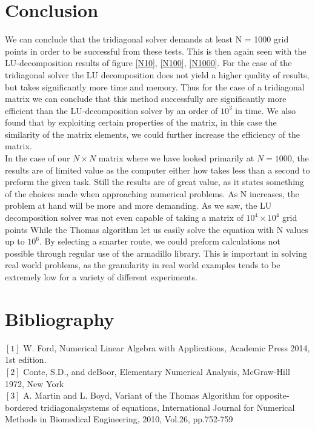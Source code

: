 \documentclass[%
reprint,
amsmath,amssymb,
aps,
]{revtex4-1}
\begin{document}
\section*{Conclusion}
\noindent We can conclude that the tridiagonal solver demands at least N = 1000 grid points in order to be successful from these tests. This is then again seen with the LU-decomposition results of figure \ref{N10}, \ref{N100}, \ref{N1000}. For the case of the tridiagonal solver the LU decomposition does not yield a higher quality of results, but takes significantly more time and memory. Thus for the case of a tridiagonal matrix we can conclude that this method successfully are significantly more efficient than the LU-decomposition solver by an order of $10^3$ in time. We also found that by exploiting certain properties of the matrix, in this case the similarity of the matrix elements, we could further increase the efficiency of the matrix. \\
\indent In the case of our $N\times N$ matrix where we have looked primarily at $N=1000$, the results are of limited value as the computer either how takes less than a second to preform the given task. Still the results are of great value, as it states something of the choices made when approaching numerical problems. As N increases, the problem at hand will be more and more demanding. As we saw, the LU decomposition solver was not even capable of taking a matrix of $10^4 \times 10^4$ grid points While the Thomas algorithm let us easily solve the equation with N values up to $10^6$. By selecting a smarter route, we could preform calculations not possible through regular use of the armadillo library. This is important in solving real world problems, as the granularity in real world examples tends to be extremely low for a variety of different experiments. 



\newpage 
\onecolumngrid
\section*{Bibliography}
\noindent $[1]$ W. Ford, Numerical Linear Algebra with Applications, Academic Press 2014, 1st edition.\\ 
$[2]$ Conte, S.D., and deBoor, Elementary Numerical Analysis, McGraw-Hill 1972, New York \\ 
$[3]$ A. Martin and L. Boyd, Variant of the Thomas Algorithm for opposite-bordered tridiagonalsystems of equations, International Journal for Numerical Methods in Biomedical Engineering, 2010, Vol.26, pp.752-759
\end{document}

